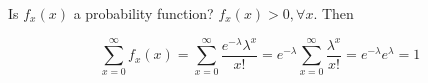 \documentclass{report}
\begin{document}
\begin{description}
\begin{mdframed}
            Is $f_x(x)$ a probability function?
             $f_x(x) > 0, \forall x$. Then

              \begin{displaymath}
                  \sum_{x=0}^{\infty} f_x(x) 
                  = \sum_{x=0}^{\infty} \frac{e^{-\lambda}\lambda^x}{x!}
                  = e^{-\lambda} \sum_{x=0}^{\infty} \frac{\lambda^x}{x!}
                  = e^{-\lambda}e^\lambda = 1
             \end{displaymath}
             
        \end{mdframed}
    \item {\large }
    \item {\large}
    \item {\large}
\end{description}
\end{document}
